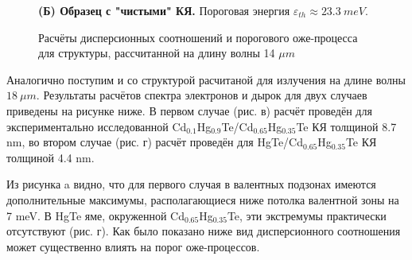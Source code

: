 \documentclass[../main.tex]{subfiles}
\begin{document}
\begin{figure}[h!]
\begin{minipage}[h]{0.49\linewidth}
\begin{center}
                    \textbf{(Б) Образец с "чистыми" КЯ.} Пороговая энергия 
                        $\varepsilon_{th} \approx 23.3~meV$.
                \end{center}
            \end{minipage}
            \caption{Расчёты дисперсионных соотношений и порогового оже-процесса
            для структуры, рассчитанной на длину волны 14 $\mu m$}
        \end{figure}
        
        Аналогично поступим и со структурой расчитаной для излучения на длине волны  
        $18~\mu m$. Результаты расчётов спектра электронов и дырок для двух случаев приведены на рисунке ниже. В первом случае (рис. в) расчёт проведён 
        для экспериментально исследованной Cd${}_{0.1}$Hg${}_{0.9}$Te/Cd${}_{0.65}$Hg${}_{0.35}$Te КЯ толщиной 8.7 nm, во втором случае (рис. г) расчёт проведён для 
        HgTe/Cd${}_{0.65}$Hg${}_{0.35}$Te КЯ толщиной 4.4 nm.

        Из рисунка a видно, что для первого случая в валентных подзонах имеются дополнительные максимумы, располагающиеся ниже потолка валентной 
        зоны на 7 meV. В HgTe яме, окруженной Cd${}_{0.65}$Hg${}_{0.35}$Te, эти экстремумы практически отсутствуют (рис. г). Как было показано ниже
        вид дисперсионного соотношения может существенно влиять на порог оже-процессов.
\end{document}
